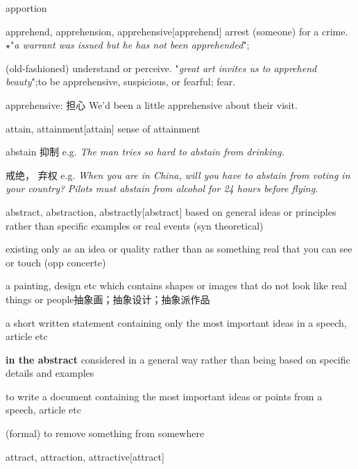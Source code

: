 \begin{word}{apportion}
\end{word}

\begin{word}{apprehend, apprehension, apprehensive}[apprehend]
    arrest (someone) for a crime.
    $\star$"\textit{a warrant was issued but he has not been apprehended}";
    
    (old-fashioned) understand or perceive.
    "\textit{great art invites us to apprehend beauty}";to be apprehensive, suspicious, or fearful; fear.

    apprehensive: 担心 We'd been a little {apprehensive} about their visit.
\end{word}

\begin{word}{attain, attainment}[attain]
    sense of attainment
\end{word}

\begin{word}{abstain}
    抑制
    e.g. \textit{The man tries so hard to abstain from drinking.}
    
    戒绝， 弃权
    e.g. \textit{When you are in China, will you have to abstain from voting in your country?}
    \textit{Pilots must abstain from alcohol for 24 hours before flying.}
\end{word}

\begin{word}{abstract, abstraction, abstractly}[abstract]
    based on general ideas or principles rather than specific examples or real events (syn theoretical)

    existing only as an idea or quality rather than as something real that you can see or touch (opp concerte)

    a painting, design etc which contains shapes or images that do not look like real things or people抽象画；抽象设计；抽象派作品

    a short written statement containing only the most important ideas in a speech, article etc
    
    \textbf{in the abstract} considered in a general way rather than being based on specific details and examples

    to write a document containing the most important ideas or points from a speech, article etc

    (formal) to remove something from somewhere
\end{word}

\begin{word}{attract, attraction, attractive}[attract]
\end{word}